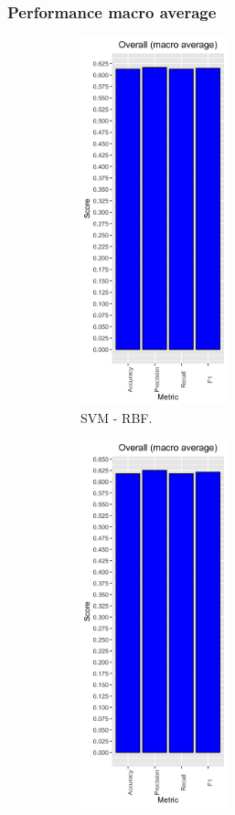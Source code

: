\subsubsection{Performance macro average}
\begin{figure}[H]
	\centering
	\begin{subfigure}[b]{0.3\textwidth}
		\includegraphics[width=4.25cm]{../images/svmRadial_performance.png}
		\caption{SVM - RBF.}
	\end{subfigure}
	\begin{subfigure}[b]{0.3\textwidth}
		\includegraphics[width=4.25cm]{../images/svmLinear_performance.png}

\end{subfigure}
\end{figure}
